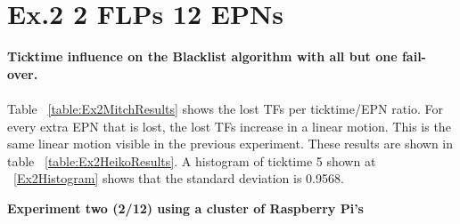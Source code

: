 \section{Ex.2 2 FLPs 12 EPNs}
\textbf{Ticktime influence on the Blacklist algorithm with all but one fail-over.}
\\~\\
Table ~\ref{table:Ex2MitchResults} shows the lost TFs per ticktime/EPN ratio. For every extra EPN that is lost, the lost TFs increase in a linear motion. This is the same linear motion visible in the previous experiment. These results are shown in table ~\ref{table:Ex2HeikoResults}. A histogram of ticktime 5 shown at ~\ref{Ex2Histogram} shows that the standard deviation is 0.9568.

\begin{table}[h!]
\caption*{\textbf{Experiment two (2/12) using a cluster of Raspberry Pi's}}
\caption{Cumulative lost TFs by ticktime/EPN ratio with a flat sample size for the Blacklist algorithm}
\label{table:Ex2MitchResults}
\end{table}

